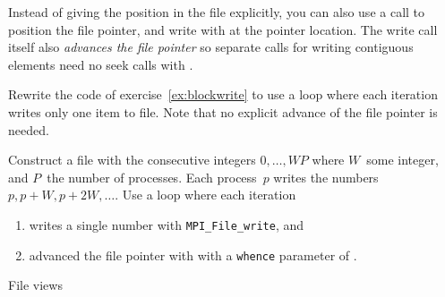 Instead of giving the position in the file explicitly, you can also
use a  call to position the file pointer,
and write with  at the pointer location.
The write call itself also 
\emph{advances the file pointer}
so separate calls for writing contiguous elements 
need no seek calls with .

\begin{exercise}
  \label{ex:blockadvance}
  Rewrite the code of exercise~\ref{ex:blockwrite} to
  use a loop where each iteration
  writes only one item to file.
  Note that no explicit advance of the file pointer is needed.
\end{exercise}

\begin{exercise}
  \label{ex:blockseek}
  Construct a file with the consecutive integers $0,\ldots,WP$ where
  $W$~some integer, and $P$~the number of processes. Each process~$p$
  writes the numbers $p,p+W,p+2W,\ldots$. Use a loop where each iteration
  \begin{enumerate}
  \item writes a single number with \lstinline{MPI_File_write}, and
  \item advanced the file pointer with 
    with a \lstinline{whence} parameter of
    .
  \end{enumerate}
\end{exercise}

 {File views}


